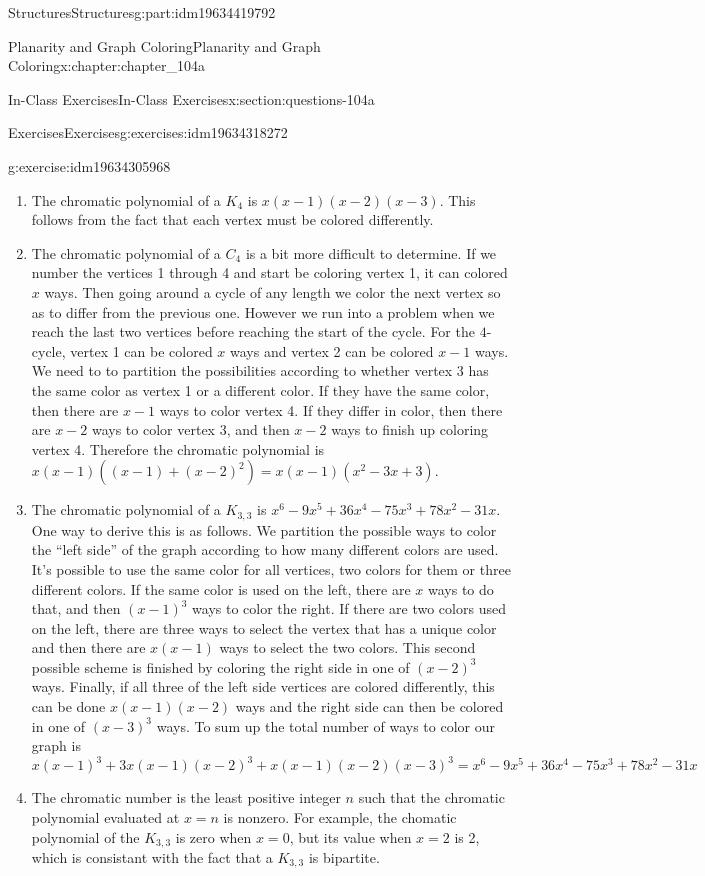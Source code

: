\documentclass[oneside,10pt,]{book}
\numberwithin{equation}{section}
\begin{document}
\begin{partptx}{Structures}{}{Structures}{}{}{g:part:idm19634419792}
\begin{chapterptx}{Planarity and Graph Coloring}{}{Planarity and Graph Coloring}{}{}{x:chapter:chapter_104a}
\begin{sectionptx}{In-Class Exercises}{}{In-Class Exercises}{}{}{x:section:questions-104a}
\begin{exercises-subsection-numberless}{Exercises}{}{Exercises}{}{}{g:exercises:idm19634318272}
\begin{exercisegroup}
\begin{divisionexerciseeg}{5}{}{}{g:exercise:idm19634305968}
\begin{enumerate}[label=(\alph*)]
\item{}The chromatic polynomial of a \(K_4\) is \(x(x-1)(x-2)(x-3)\). This follows from the fact that each vertex must be colored differently.%
\item{}The chromatic polynomial of a \(C_4\) is a bit more difficult to determine.   If we number the vertices 1 through 4 and start be coloring vertex 1, it can colored \(x\) ways.  Then going around a cycle of any length we color the next vertex so as to differ from the previous one.  However we run into a problem when we reach the last two vertices before reaching the start of the cycle.  For the \(4\)-cycle, vertex 1 can be colored \(x\) ways and vertex 2 can be colored \(x-1\) ways. We need to to partition the possibilities according to whether vertex 3 has the same color as vertex 1 or a different color.  If they have the same color, then there are \(x-1\) ways to color vertex 4.  If they differ in color, then there are \(x-2\) ways to color vertex 3, and then \(x-2\) ways to finish up coloring vertex 4. Therefore the chromatic polynomial is \(x(x-1)((x-1)+(x-2)^2)= x(x-1)(x^2-3x+3)\).%
\item{}The chromatic polynomial of a \(K_{3,3}\) is \(x^6-9 x^5+36 x^4-75 x^3+78 x^2-31 x\). One way to derive this is as follows. We partition the possible ways to color the ``left side'' of the graph according to how many different colors are used.  It's possible to use the same color for all vertices, two colors for them or three different colors.  If the same color is used on the left, there are \(x\) ways to do that, and then \((x-1)^3\) ways to color the right. If there are two colors used on the left, there are three ways to select the vertex that has a unique color and then there are \(x(x-1)\) ways to select the two colors. This second possible scheme is finished by coloring the right side in one of  \((x-2)^3\) ways.  Finally, if all three of the left side vertices are colored differently, this can be done \(x(x-1)(x-2)\) ways and the right side can then be colored in one of \((x-3)^3\) ways.  To sum up the total number of ways to color our graph is%
\begin{equation*}
x (x-1)^3  +3x (x-1) (x-2)^3 + x (x-1) (x-2) (x-3)^3= x^6-9 x^5+36 x^4-75 x^3+78 x^2-31 x
\end{equation*}
%
\item{}The chromatic number is the least positive integer \(n\) such that the chromatic polynomial evaluated at \(x=n\) is nonzero.  For example, the chomatic polynomial of the \(K_{3,3}\) is zero when \(x=0\), but its value when \(x=2\) is 2, which is consistant with the fact that a \(K_{3,3}\) is bipartite.%

\end{enumerate}
\end{divisionexerciseeg}
\end{exercisegroup}
\end{exercises-subsection-numberless}
\end{sectionptx}
\end{chapterptx}
\end{partptx}
\end{document}
